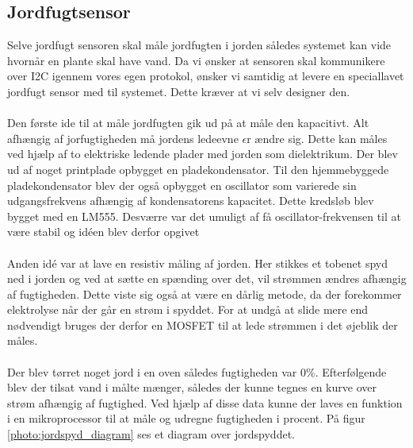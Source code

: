 \subsection{Jordfugtsensor}
Selve jordfugt sensoren skal måle jordfugten i jorden således systemet kan vide hvornår en plante skal have vand. 
Da vi ønsker at sensoren skal kommunikere over I2C igennem vores egen protokol, ønsker vi samtidig at levere en speciallavet jordfugt sensor med til systemet. Dette kræver at vi selv designer den. 
\\\\
Den første ide til at måle jordfugten gik ud på at måle den kapacitivt.  
Alt afhængig af jorfugtigheden må jordens ledeevne $\epsilon$r ændre sig. Dette kan måles ved hjælp af to elektriske ledende plader med jorden som dielektrikum. Der blev ud af noget printplade opbygget en pladekondensator. Til den hjemmebyggede pladekondensator blev der også opbygget en oscillator som varierede sin udgangsfrekvens afhængig af kondensatorens kapacitet. Dette kredsløb blev bygget med en LM555. Desværre var det umuligt af få oscillator-frekvensen til at være stabil og idéen blev derfor opgivet
\\\\
Anden idé var at lave en resistiv måling af jorden. Her stikkes et tobenet spyd ned i jorden og ved at sætte en spænding over det, vil strømmen ændres afhængig af fugtigheden. Dette viste sig også at være en dårlig metode, da der forekommer elektrolyse når der går en strøm i spyddet. For at undgå at slide mere end nødvendigt bruges der derfor en MOSFET til at lede strømmen i det øjeblik der måles.  
\\\\
Der blev tørret noget jord i en oven således fugtigheden var 0\%. Efterfølgende blev der tilsat vand i målte mænger, således der kunne tegnes en kurve over strøm afhængig af fugtighed. Ved hjælp af disse data kunne der laves en funktion i en mikroprocessor til at måle og udregne fugtigheden i procent. På figur \ref{photo:jordspyd_diagram} ses et diagram over jordspyddet. 

